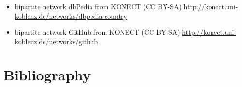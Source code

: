 \documentclass[
a4paper,     %
12pt         %
]{scrartcl}  %
\begin{document}
\begin{itemize}
\item bipartite network dbPedia from KONECT (CC BY-SA) \url{http://konect.uni-koblenz.de/networks/dbpedia-country} \citep{konect:2014:dbpedia-country}
\item bipartite network GitHub from KONECT (CC BY-SA) \url{http://konect.uni-koblenz.de/networks/github} \citep{konect:2014:github}
\end{itemize}


\newpage

\section{Bibliography}
\label{sec:bibliography}
\printbibliography



% 

% 
\end{document}
